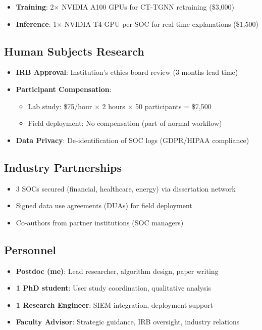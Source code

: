 \documentclass[11pt]{article}
\begin{document}
\begin{itemize}
    \item \textbf{Training}: 2$\times$ NVIDIA A100 GPUs for CT-TGNN retraining (\$3,000)
    \item \textbf{Inference}: 1$\times$ NVIDIA T4 GPU per SOC for real-time explanations (\$1,500)
\end{itemize}

\subsection{Human Subjects Research}

\begin{itemize}
    \item \textbf{IRB Approval}: Institution's ethics board review (3 months lead time)
    \item \textbf{Participant Compensation}:
    \begin{itemize}
        \item Lab study: \$75/hour $\times$ 2 hours $\times$ 50 participants = \$7,500
        \item Field deployment: No compensation (part of normal workflow)
    \end{itemize}
    \item \textbf{Data Privacy}: De-identification of SOC logs (GDPR/HIPAA compliance)
\end{itemize}

\subsection{Industry Partnerships}

\begin{itemize}
    \item 3 SOCs secured (financial, healthcare, energy) via dissertation network
    \item Signed data use agreements (DUAs) for field deployment
    \item Co-authors from partner institutions (SOC managers)
\end{itemize}

\subsection{Personnel}

\begin{itemize}
    \item \textbf{Postdoc (me)}: Lead researcher, algorithm design, paper writing
    \item \textbf{1 PhD student}: User study coordination, qualitative analysis
    \item \textbf{1 Research Engineer}: SIEM integration, deployment support
    \item \textbf{Faculty Advisor}: Strategic guidance, IRB oversight, industry relations
\end{itemize}
\end{document}
